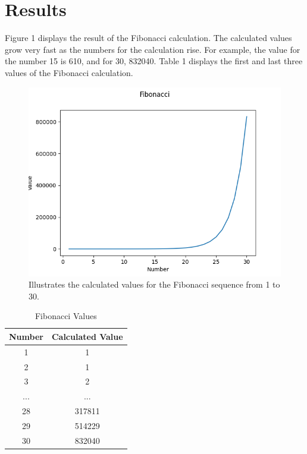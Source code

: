 \documentclass[10pt, a4paper, twocolumn]{article} %
\begin{document}
\section{Results}
Figure 1 displays the result of the Fibonacci calculation. The calculated values grow very fast as the numbers for the calculation rise. For example, the value for the number 15 is 610, and for 30, 832040. Table 1 displays the first and last three values of the Fibonacci calculation.    

\begin{figure}[t] %
  \centering
  \includegraphics[width=\columnwidth]{pics/fibonacci_1.png}
  \caption{Illustrates the calculated values for the Fibonacci sequence from 1 to 30.}
  \label{fig:fibonacciPlot}
\end{figure}

\begin{table}[h]
         \label{tab:fibonacciValuesTable}
	\caption{Fibonacci Values}
	\centering
	\begin{tabular}{c c}
		\toprule
		Number & Calculated Value \\
		\midrule
		1 & 1 \\
		2 & 1 \\
		3 & 2 \\
		... & ... \\
		28 & 317811 \\
		29 & 514229 \\
		30 & 832040 \\
		\bottomrule
	\end{tabular}
\end{table}
\end{document}
